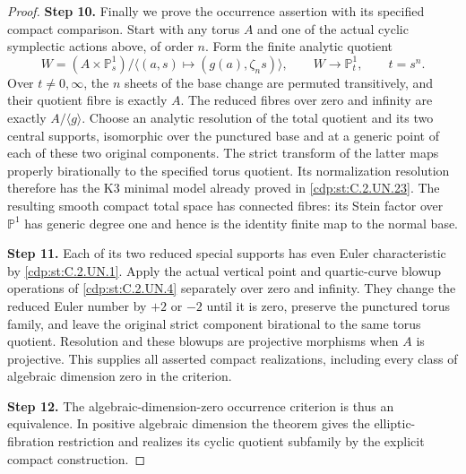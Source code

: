 \begin{proof}
\noindent\textbf{Step 10.} Finally we prove the occurrence assertion with its
specified compact comparison. Start with any torus
$A$ and one of the actual cyclic symplectic actions
above, of order $n$. Form the finite analytic quotient
\[
 W=(A\times\mathbb P^1_s)/
       \langle(a,s)\mapsto(g(a),\zeta_ns)\rangle,
 \qquad W\longrightarrow\mathbb P^1_t,
 \qquad t=s^n.
                                                               \tag{C.K3.10}\label{cdp:eq:C.K3.10}
\]
Over $t\ne0,\infty$, the $n$ sheets of the base
change are permuted transitively, and their quotient
fibre is exactly $A$. The reduced fibres over zero
and infinity are exactly $A/\langle g\rangle$.
Choose an analytic resolution of the total quotient
and its two central supports, isomorphic over the
punctured base and at a generic point of each of
these two original components. The strict transform
of the latter maps properly birationally to the
specified torus quotient. Its normalization resolution
therefore has the K3 minimal model already proved
in \ref{cdp:st:C.2.UN.23}. The resulting smooth compact total
space has connected fibres: its Stein factor over
$\mathbb P^1$ has generic degree one and hence is
the identity finite map to the normal base.

\noindent\textbf{Step 11.} Each of its two reduced special supports has even
Euler characteristic by \ref{cdp:st:C.2.UN.1}. Apply the actual
vertical point and quartic-curve blowup operations
of \ref{cdp:st:C.2.UN.4} separately over zero and infinity.
They change the reduced Euler number by $+2$ or
$-2$ until it is zero, preserve the punctured torus
family, and leave the original strict component
birational to the same torus quotient. Resolution
and these blowups are projective morphisms when
$A$ is projective. This supplies all asserted
compact realizations, including every class of
algebraic dimension zero in the criterion.

\noindent\textbf{Step 12.} The algebraic-dimension-zero occurrence criterion
is thus an equivalence. In positive algebraic
dimension the theorem gives the elliptic-fibration
restriction and realizes its cyclic quotient
subfamily by the explicit compact construction.
\end{proof}
